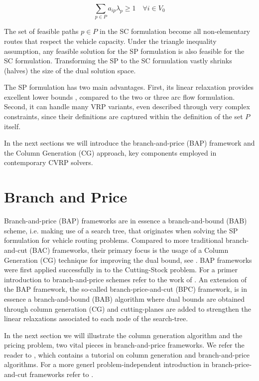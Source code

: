 \begin{equation}\label{eq:set-covering-customers-visited-by-exactly-one-route}
	\sum_{p \in P}  a_{ip} \lambda_p \ge 1  \quad \forall i \in V_0
\end{equation}

The set of feasible paths $p \in P$ in the SC formulation
become all non-elementary routes that respect the vehicle capacity.
Under the triangle inequality assumption,
any feasible solution for the SP formulation is also feasible for the SC formulation.
Transforming the SP to the SC formulation vastly shrinks (halves) the size of the dual solution space.

\medskip


The SP formulation has two main advantages.
First, its linear relaxation provides excellent lower bounds \parencite{bramel1997},
compared to the two or three arc flow formulation.
Second, it can handle many VRP variants,
even described through very complex constraints,
since their definitions are captured within the definition of the set $P$ itself.


\medskip

In the next sections we will introduce
the branch-and-price (BAP) framework and the Column Generation (CG) approach,
key components employed in contemporary CVRP solvers.


\section{Branch and Price}
\label{sec:intro-branch-and-price}

Branch-and-price (BAP) frameworks are in essence a branch-and-bound (BAB) scheme,
i.e. making use of a search tree,
that originates when solving the SP formulation for vehicle routing problems.
Compared to more traditional branch-and-cut (BAC) frameworks,
their primary focus is the usage of a Column Generation (CG) technique for improving the dual bound,
see \textcite{righini2008}.
BAP frameworks were first applied successfully in \textcite{gilmore1961} to the Cutting-Stock problem.
For a primer introduction to branch-and-price schemes refer to the work of \textcite{barnhart1998}.
An extension of the BAP framework, the so-called branch-price-and-cut (BPC) framework,
is in essence a branch-and-bound (BAB) algorithm where dual bounds are obtained through column generation (CG)
and cutting-planes are added to strengthen the linear relaxations associated to each node of the search-tree.

In the next section we will illustrate the column generation algorithm
and the pricing problem, two vital pieces in branch-and-price frameworks.
We refer the reader to \textcite{feillet2010}, which contains a tutorial
on column generation and branch-and-price algorithms.
For a more generl problem-independent introduction in branch-price-and-cut frameworks refer to \textcite{desrosiers2011}.


